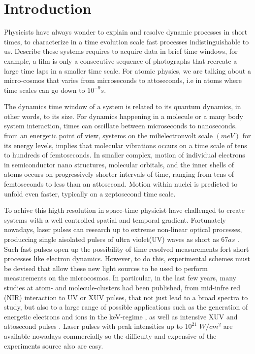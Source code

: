 \section{Introduction}

Physicists have always wonder to explain and resolve dynamic processes in short times, to characterize in a time  evolution scale fast processes indistinguishable to us. Describe these systems requires to acquire data in brief time windows, for example, a film is only a consecutive sequence of  photographs that recreate a large time laps in a smaller time scale. For  atomic physics, we are talking about a micro-cosmos that varies from microseconds to  attoseconds, i.e in atoms  where time scales can go down to $10^{-9} s$.

The dynamics time window of a system is related to its quantum dynamics, in other words, to its size. For dynamics happening in a molecule or a many body system interaction,  times can oscillate between  microseconds to nanoseconds. from an energetic point of view, systems on the milielectronvolt scale $(meV)$ for its energy levels, implies that molecular vibrations occurs on a time scale of tens to hundreds of femtoseconds. In smaller complex, motion of individual electrons in semiconductor nano structures, molecular orbitals, and the inner shells of atoms occurs on progressively shorter intervals of time, ranging from tens of femtoseconds to less than an attosecond. Motion within nuclei is predicted to unfold even faster, typically on a zeptosecond time scale.

To achive this higth resolution in space-time physicist have challenged to create systems with a well controlled spatial and temporal gradient. Fortunately nowadays, laser pulses can research up to extreme non-linear optical processes, produccing single aisolated  pulses of ultra violet(UV) waves as short as $67 as$ \cite{zhao_tailoring_2012}.  Such fast pulses open up the possibility of time resolved measurements fort short processes like electron dynamics.  However, to do this, experimental schemes must be devised that allow these new light sources to be used to perform measurements on the microcosmos. In particular, in the last few years,  many studies at atom- and molecule-clusters had been published, from mid-infre red (NIR) interaction to UV or XUV pulses, that not just lead to a broad spectra to study, but also to a large range of possible applications such as the generation of  energetic electrons and ions in the keV-regime \cite{fennel_laser-driven_2010}, as well as intensive XUV and attosecond pulses \cite{stebbings_generation_2011}. Laser pulses with peak intensities up to $10^{21}$ $W/cm^{2}$  are available nowadays \cite{mikaberidze_atomic_1981} commercially so the difficulty and expensive of the experiments source also are easy.

